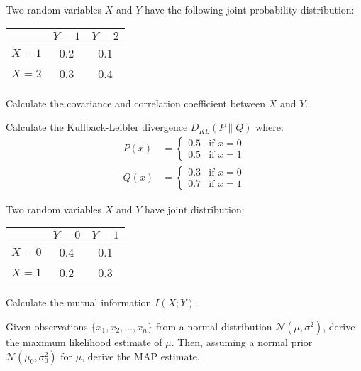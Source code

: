 \begin{problem}
Two random variables $X$ and $Y$ have the following joint probability distribution:
\begin{center}
\begin{tabular}{|c|c|c|}
\hline
 & $Y=1$ & $Y=2$ \\
\hline
$X=1$ & 0.2 & 0.1 \\
$X=2$ & 0.3 & 0.4 \\
\hline
\end{tabular}
\end{center}
Calculate the covariance and correlation coefficient between $X$ and $Y$.
\end{problem}

\begin{problem}[KL Divergence]
Calculate the Kullback-Leibler divergence $D_{KL}(P \| Q)$ where:
\begin{align}
P(x) &= \begin{cases} 0.5 & \text{if } x = 0 \\ 0.5 & \text{if } x = 1 \end{cases} \\
Q(x) &= \begin{cases} 0.3 & \text{if } x = 0 \\ 0.7 & \text{if } x = 1 \end{cases}
\end{align}
\end{problem}

\begin{problem}
Two random variables $X$ and $Y$ have joint distribution:
\begin{center}
\begin{tabular}{|c|c|c|}
\hline
 & $Y=0$ & $Y=1$ \\
\hline
$X=0$ & 0.4 & 0.1 \\
$X=1$ & 0.2 & 0.3 \\
\hline
\end{tabular}
\end{center}
Calculate the mutual information $I(X; Y)$.
\end{problem}

\begin{problem}
Given observations $\{x_1, x_2, \ldots, x_n\}$ from a normal distribution $\mathcal{N}(\mu, \sigma^2)$, derive the maximum likelihood estimate of $\mu$. Then, assuming a normal prior $\mathcal{N}(\mu_0, \sigma_0^2)$ for $\mu$, derive the MAP estimate.
\end{problem}

